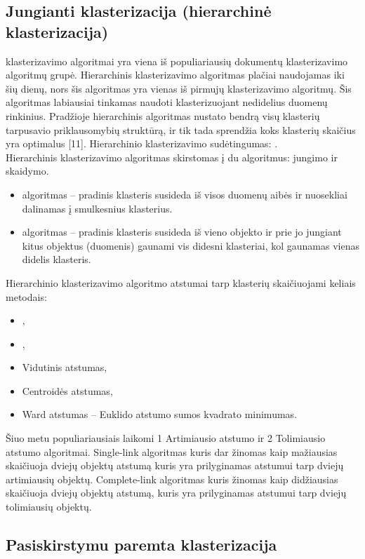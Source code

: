 \documentclass{VUMIFInfKursinis}
\begin{document}
	\subsection{Jungianti klasterizacija (hierarchinė klasterizacija)}
		 klasterizavimo algoritmai yra viena iš populiariausių dokumentų klasterizavimo algoritmų grupė. Hierarchinis klasterizavimo algoritmas plačiai naudojamas iki šių dienų, nors šis algoritmas yra vienas iš pirmujų klasterizavimo algoritmų. Šis algoritmas labiausiai tinkamas naudoti klasterizuojant nedidelius duomenų rinkinius. Pradžioje hierarchinis algoritmas nustato bendrą visų klasterių tarpusavio priklausomybių struktūrą, ir tik tada sprendžia koks klasterių skaičius yra optimalus [11]. Hierarchinio klasterizavimo sudėtingumas: .\\
		Hierarchinis klasterizavimo algoritmas skirstomas į du algoritmus: jungimo ir skaidymo.
		\begin{itemize}
			\item {} algoritmas – pradinis klasteris susideda iš visos duomenų aibės ir nuosekliai dalinamas į smulkesnius klasterius.
			\item {} algoritmas – pradinis klasteris susideda iš vieno objekto ir prie jo jungiant kitus objektus (duomenis) gaunami vis didesni klasteriai, kol gaunamas vienas didelis klasteris.
		\end{itemize}
		Hierarchinio klasterizavimo algoritmo atstumai tarp klasterių skaičiuojami keliais metodais:
		\begin{itemize}
			\item {},
			\item {},
			\item Vidutinis atstumas,
			\item Centroidės atstumas,
			\item Ward atstumas – Euklido atstumo sumos kvadrato minimumas.
		\end{itemize}
		Šiuo metu populiariausiais laikomi 1 Artimiausio atstumo ir 2 Tolimiausio atstumo algoritmai.  Single-link algoritmas kuris dar žinomas kaip mažiausias skaičiuoja dviejų objektų atstumą kuris yra prilyginamas atstumui tarp dviejų artimiausių objektų. Complete-link algoritmas kuris žinomas kaip didžiausias skaičiuoja dviejų objektų atstumą, kuris yra prilyginamas atstumui tarp dviejų tolimiausių objektų.
	\subsection{Pasiskirstymu paremta klasterizacija}
\end{document}

